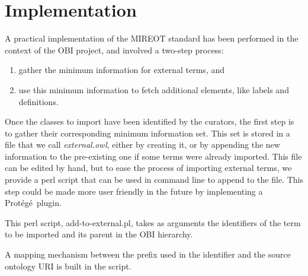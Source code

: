 \documentclass{elsart3p}    %
\newcommand{\protege}{Prot\'{e}g\'{e}}
\begin{document}
\section*{Implementation}

A practical implementation of the MIREOT standard has been performed in the context of the OBI project, and involved a two-step process:

\begin{enumerate}
\item gather the minimum information for external terms, and
\item use this minimum information to fetch additional elements, like labels and definitions.
\end{enumerate}


Once the classes to import have been identified by the curators, the first step is to gather their corresponding minimum information set.
This set is stored in a file that we call \emph{external.owl}, either by creating it, or by appending the new information to the pre-existing one if some terms were already imported.
This file can be edited by hand, but to ease the process of importing external terms, we provide a perl script that can be used in command line to append to the file. This step could be made more user friendly in the future by implementing a \protege\ plugin.

This perl script, add-to-external.pl, takes as arguments the identifiers of the term to be imported and its parent in the OBI hierarchy.


A mapping mechanism between the prefix used in the identifier and the source ontology URI is built in the script.
\end{document}
